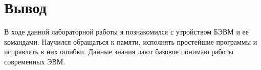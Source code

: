 \section{Вывод}
В ходе данной лабораторной работы я познакомился с утройством БЭВМ и ее командами. Научился обращаться к памяти, исполнять простейшие программы и исправлять в них ошибки. Данные знания дают базовое понимаю работы современных ЭВМ.
